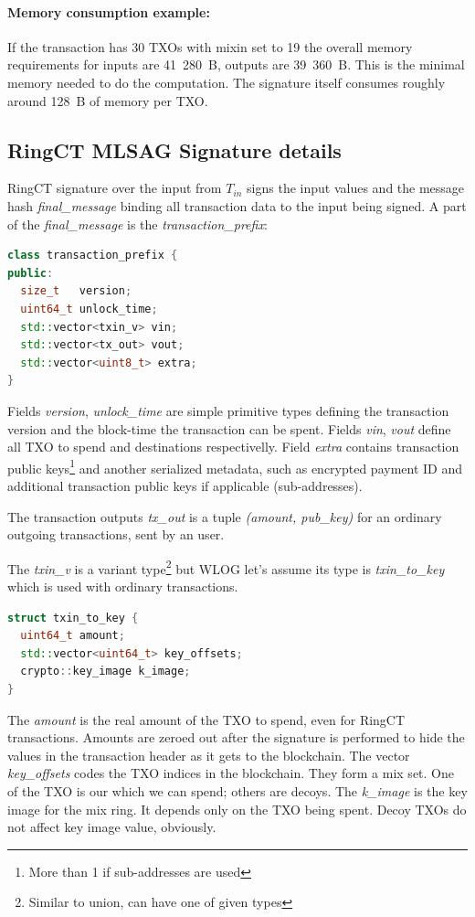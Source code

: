 \documentclass[]{article}
\begin{document}
\paragraph{Memory consumption example:}
If the transaction has 30 TXOs with mixin set to 19 the overall memory requirements for inputs are 41~280~B, outputs are 39~360~B. This is the minimal memory needed to do the computation. The signature itself consumes roughly around 128~B of memory per TXO.

\subsection{RingCT MLSAG Signature details}

RingCT signature over the input from $T_{in}$ signs the input values and the message hash \emph{final\_message} binding all transaction data to the input being signed. A part of the \emph{final\_message} is the \emph{transaction\_prefix}:

\begin{lstlisting}[language=c++]
class transaction_prefix {
public:
  size_t   version;
  uint64_t unlock_time;  
  std::vector<txin_v> vin;
  std::vector<tx_out> vout;
  std::vector<uint8_t> extra;
}
\end{lstlisting}

Fields \emph{version}, \emph{unlock\_time} are simple primitive types defining the transaction version and the block-time the transaction can be spent. Fields \emph{vin}, \emph{vout} define all TXO to spend and destinations respectivelly. Field \emph{extra} contains transaction public keys\footnote{More than 1 if sub-addresses are used} and another serialized metadata, such as encrypted payment ID and additional transaction public keys if applicable (sub-addresses).

The transaction outputs \emph{tx\_out} is a tuple \emph{(amount, pub\_key)} for an ordinary outgoing transactions, sent by an user. 

The \emph{txin\_v} is a variant type\footnote{Similar to union, can have one of given types} but WLOG let's assume its type is \emph{txin\_to\_key} which is used with ordinary transactions. 

\begin{lstlisting}[language=c++]
struct txin_to_key {
  uint64_t amount;
  std::vector<uint64_t> key_offsets;
  crypto::key_image k_image;
}
\end{lstlisting}

The \emph{amount} is the real amount of the TXO to spend, even for RingCT transactions. Amounts are zeroed out after the signature is performed to hide the values in the transaction header as it gets to the blockchain.
The vector \emph{key\_offsets} codes the TXO indices in the blockchain. They form a mix set. One of the TXO is our which we can spend; others are decoys.
The \emph{k\_image} is the key image for the mix ring. It depends only on the TXO being spent. Decoy TXOs do not affect key image value, obviously.
\end{document}

